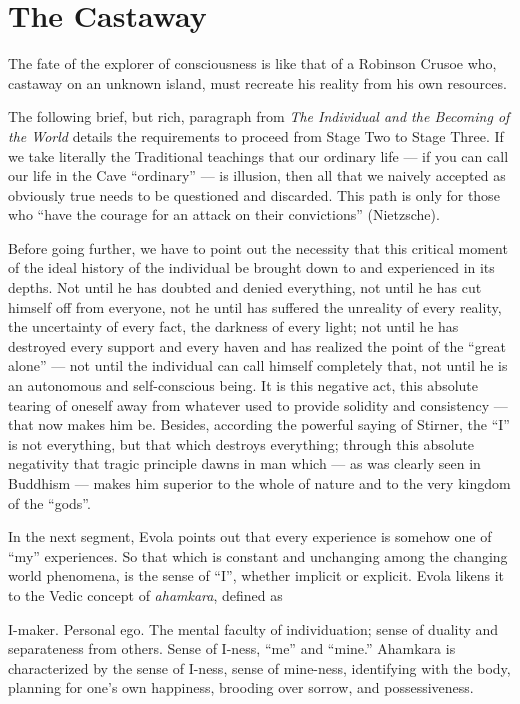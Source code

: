 \section{The Castaway}

The fate of the explorer of consciousness is like that of a Robinson Crusoe who, castaway on an unknown island, must recreate his reality from his own resources.

The following brief, but rich, paragraph from \emph{The Individual and the Becoming of the World} details the requirements to proceed from Stage Two to Stage Three. If we take literally the Traditional teachings that our ordinary life --- if you can call our life in the Cave ``ordinary'' --- is illusion, then all that we naively accepted as obviously true needs to be questioned and discarded. This path is only for those who ``have the courage for an attack on their convictions'' (Nietzsche).

\begin{quotex}
Before going further, we have to point out the necessity that this critical moment of the ideal history of the individual be brought down to and experienced in its depths. Not until he has doubted and denied everything, not until he has cut himself off from everyone, not he until has suffered the unreality of every reality, the uncertainty of every fact, the darkness of every light; not until he has destroyed every support and every haven and has realized the point of the ``great alone'' --- not until the individual can call himself completely that, not until he is an autonomous and self-conscious being. It is this negative act, this absolute tearing of oneself away from whatever used to provide solidity and consistency --- that now makes him be. Besides, according the powerful saying of Stirner, the ``I'' is not everything, but that which destroys everything; through this absolute negativity that tragic principle dawns in man which --- as was clearly seen in Buddhism --- makes him superior to the whole of nature and to the very kingdom of the ``gods''.
\end{quotex}

In the next segment, Evola points out that every experience is somehow one of ``my'' experiences. So that which is constant and unchanging among the changing world phenomena, is the sense of ``I'', whether implicit or explicit. Evola likens it to the Vedic concept of
\emph{ahamkara}, defined as
\begin{quotex}
I-maker. Personal ego. The mental faculty of individuation; sense of duality and separateness from others. Sense of I-ness, ``me'' and ``mine.'' Ahamkara is characterized by the sense of I-ness, sense of mine-ness, identifying with the body, planning for one's own happiness, brooding over sorrow, and possessiveness.
\end{quotex}


